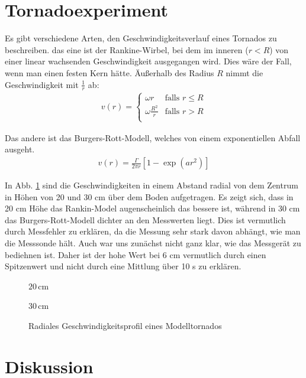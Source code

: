 \documentclass[12pt,a4paper,titlepage,headinclude,bibtotoc]{scrartcl}
\begin{document}
\section{Tornadoexperiment}
Es gibt verschiedene Arten, den Geschwindigkeitsverlauf eines Tornados zu beschreiben.
das eine ist der Rankine-Wirbel, bei dem im inneren ($r<R$) von einer linear wachsenden Geschwindigkeit ausgegangen wird.
Dies wäre der Fall, wenn man einen festen Kern hätte.
Äußerhalb des Radius $R$ nimmt die Geschwindigkeit mit $\frac{1}{r}$ ab:
\begin{align}
	v(r) = 
	\begin{cases}
		\omega r & \text{falls } r \leq R\\
		\omega \frac{R^2}{r} & \text{falls } r > R\\
	\end{cases}
\end{align}


Das andere ist das Burgers-Rott-Modell, welches von einem exponentiellen Abfall ausgeht.
\begin{align}
	v(r) = \frac{\Gamma}{2\pi r}\left[1-\exp\left(a r^2\right)\right]
\end{align}

In Abb. \ref{fig:tornado} sind die Geschwindigkeiten in einem Abstand radial von dem Zentrum in Höhen von 20 und 30 cm über dem Boden aufgetragen.
Es zeigt sich, dass in 20 cm Höhe das Rankin-Model augenscheinlich das bessere ist, während in 30 cm das Burgers-Rott-Modell dichter an den Messwerten liegt.
Dies ist vermutlich durch Messfehler zu erklären, da die Messung sehr stark davon abhängt, wie man die Messsonde hält.
Auch war uns zunächst nicht ganz klar, wie das Messgerät zu bediehnen ist.
Daher ist der hohe Wert bei 6 cm vermutlich durch einen Spitzenwert und nicht durch eine Mittlung über 10 s zu erklären.


 \begin{figure}[!htb]
	\begin{minipage}{0.5\textwidth}	
		\resizebox{\textwidth}{!}{   		
   		}
   		\caption*{$20\,$cm}
   \end{minipage}   
   \begin{minipage}{0.5\textwidth}   		
		\resizebox{\textwidth}{!}{   		
   		}
   		\caption*{$30\,$cm}
   \end{minipage}
   \caption{Radiales Geschwindigkeitsprofil eines Modelltornados\label{fig:tornado}}
 \end{figure}

\section{Diskussion}
\label{sec:diskussion}



\end{document}
